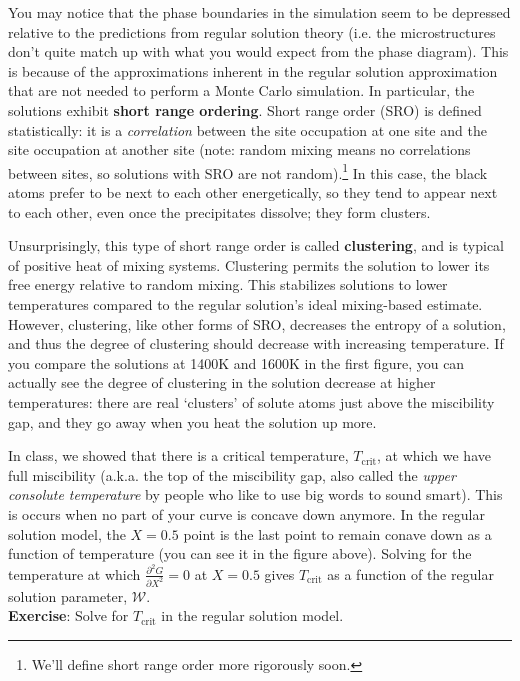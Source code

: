 \documentclass[12pt]{article}
\begin{document}
You may notice that the phase boundaries in the simulation seem to be depressed relative to the predictions from regular solution theory (i.e. the microstructures don't quite match up with what you would expect from the phase diagram). This is because of the approximations inherent in the
regular solution approximation that are not needed to perform a Monte Carlo simulation. In particular, the solutions exhibit \textbf{short range ordering}.
Short range order (SRO) is defined statistically: it is a \textit{correlation} between the site occupation at one site and the site occupation at
another site (note: random mixing means no correlations between sites, so solutions with SRO are not random).\footnote{We'll define short range order more rigorously soon.} In this case, the black atoms prefer
to be next to each other energetically, so they tend to appear next to each other, even once the precipitates dissolve; they form clusters. \par
Unsurprisingly, this type of short range order is called \textbf{clustering}, and is typical of positive heat of mixing systems. Clustering permits the solution to lower its free energy relative to random mixing. This stabilizes solutions to lower temperatures compared to the regular solution's ideal mixing-based estimate. However, clustering, like other forms of SRO, decreases the entropy of a solution, and thus the degree of clustering
should decrease with increasing temperature. If you compare the solutions at 1400K and 1600K in the first figure, you can actually see the degree
of clustering in the solution decrease at higher temperatures: there are real `clusters' of solute atoms just above the miscibility gap, and
they go away when you heat the solution up more.\par
In class, we showed that there is a critical temperature, \(T_{\text{crit}}\), at which we have full miscibility (a.k.a. the top of the miscibility gap, also called the \textit{upper consolute temperature} by people who like to use big words to sound smart). This is occurs when no part of your
curve is concave down anymore. In the regular solution model, the $X = 0.5$ point is the last point to remain conave down as a function of temperature
(you can see it in the figure above). Solving for the temperature at which \(\frac{\partial ^2G}{\partial X^2}=0\) at $X = 0.5$ gives \(T_{\text{crit}}\)
as a function of the regular solution parameter, $\mathcal{W}$. \\
\textbf{Exercise}: Solve for \(T_{\text{crit}}\) in  the regular solution model.
\end{document}
